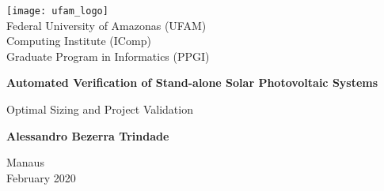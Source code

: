 \begin{titlepage}
    \begin{center}
      \texttt{[image: ufam\_logo]} \\
        \Large
        Federal University of Amazonas (UFAM)\\
        Computing Institute (IComp)\\
        Graduate Program in Informatics (PPGI)\\

        \vspace*{3cm}
        
        \Huge
        \textbf{Automated Verification of Stand-alone Solar Photovoltaic Systems}
        
        \vspace{0.5cm}
        \LARGE
        Optimal Sizing and Project Validation

        \vspace{3.0cm}
        
        \textbf{Alessandro Bezerra Trindade}
        
%        
%        
        \vspace{3cm}
%        
        
        \Large
		Manaus \\

        February 2020 \\


    \end{center}
\end{titlepage}